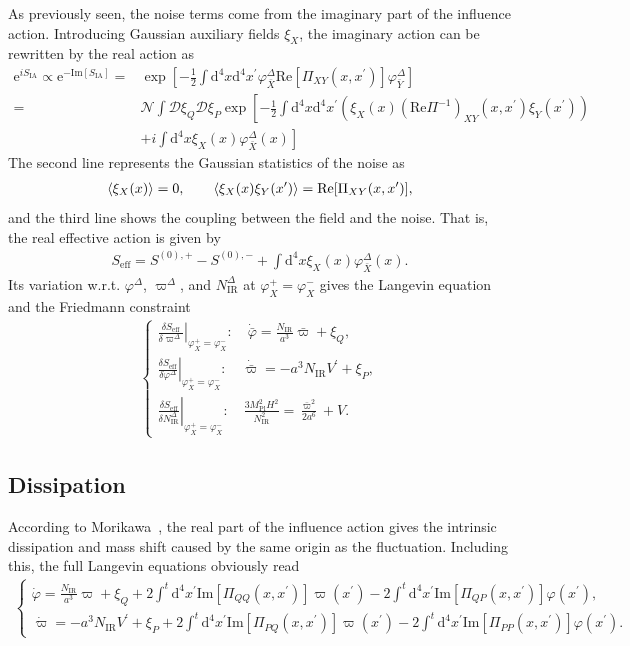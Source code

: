 \documentclass[aps, prd
, preprint
, nofootinbib 
]{revtex4-1}
\newcommand{\var}[2]{\frac{\delta #1}{\delta #2}}
\newcommand{\dd}{\mathrm{d}}
\newcommand{\ee}{\mathrm{e}}
\newcommand{\Mpl}{M_\text{Pl}}
\newcommand{\IR}{\text{IR}}
\renewcommand{\Re}{\mathrm{Re}}
\renewcommand{\Im}{\mathrm{Im}}
\newcommand{\dps}{\displaystyle}
\newcommand{\calN}{\mathcal{N}}
\newcommand{\scrD}{\mathscr{D}}
\newcommand{\SIA}{S_\text{IA}}
\newcommand{\bae}[1]{\begin{align} #1 \end{align}}
\newcommand{\bce}[1]{\begin{cases} #1 \end{cases}}
\begin{document}
As previously seen, the noise terms come from the imaginary part of the influence action.
Introducing Gaussian auxiliary fields $\xi_X$, the imaginary action can be rewritten by the real action as
\bae{
	\ee^{i\SIA}\propto\ee^{-\Im[\SIA]}=&\exp\left[-\frac{1}{2}\int\dd^4x\dd^4x^\prime
	\varphi_{\bar{X}}^\Delta\Re[\Pi_{XY}(x,x^\prime)]\varphi_{\bar{Y}}^\Delta\right] \nonumber \\
	=&\calN\int\scrD\xi_Q\scrD\xi_P\exp\left[-\frac{1}{2}\int\dd^4x\dd^4x^\prime\left(\xi_X(x)(\Re\Pi^{-1})_{XY}(x,x^\prime)\xi_Y(x^\prime)\right)
	\right.\nonumber \\
	&\left.+i\int\dd^4x\xi_X(x)\varphi^\Delta_{\bar{X}}(x)\right]
}
The second line represents the Gaussian statistics of the noise as
\bae{
	\braket{\xi_X(x)}=0, \quad\quad \braket{\xi_X(x)\xi_Y(x^\prime)}=\Re[\Pi_{XY}(x,x^\prime)],
}
and the third line shows the coupling between the field and the noise. That is, the real effective action is given by
\bae{
	S_\text{eff}=S^{(0),+}-S^{(0),-}+\int\dd^4x\xi_X(x)\varphi^\Delta_{\bar{X}}(x).
}
Its variation w.r.t. $\varphi^\Delta$, $\varpi^\Delta$, and $N_\IR^\Delta$ at $\varphi_X^+=\varphi_X^-$ gives 
the Langevin equation and the Friedmann constraint
\bae{
	\bce{
		\dps
		\left.\var{S_\text{eff}}{\varpi^\Delta}\right|_{\varphi_X^+=\varphi_X^-}: \quad \dot{\bar{\varphi}}=\frac{N_\IR}{a^3}\bar{\varpi}+\xi_Q, \\[10pt]
		\dps
		\left.\var{S_\text{eff}}{\varphi^\Delta}\right|_{\varphi_X^+=\varphi_X^-}: \quad 
		\dot{\bar{\varpi}}=-a^3N_\IR V^\prime+\xi_P, \\[10pt]
		\dps
		\left.\var{S_\text{eff}}{N_\IR^\Delta}\right|_{\varphi_X^+=\varphi_X^-}: \quad
		\frac{3\Mpl^2H^2}{N_\IR^2}=\frac{\bar{\varpi}^2}{2a^6}+V.
	}
}



\subsection{Dissipation}

According to Morikawa~\cite{Morikawa:1989xz}, the real part of the influence action gives the intrinsic dissipation and mass shift 
caused by the same origin as the fluctuation. Including this, the full Langevin equations obviously read
\bae{
	\bce{
		\dps
		\dot{\varphi}=\frac{N_\IR}{a^3}\varpi+\xi_Q+2\int^t\dd^4x^\prime\Im[\Pi_{QQ}(x,x^\prime)]\varpi(x^\prime)
		-2\int^t\dd^4x^\prime\Im[\Pi_{QP}(x,x^\prime)]\varphi(x^\prime), \\[10pt]
		\dps
		\dot{\varpi}=-a^3N_\IR V^\prime+\xi_P+2\int^t\dd^4x^\prime\Im[\Pi_{PQ}(x,x^\prime)]\varpi(x^\prime)
		-2\int^t\dd^4x^\prime\Im[\Pi_{PP}(x,x^\prime)]\varphi(x^\prime).
	}
}
\end{document}
